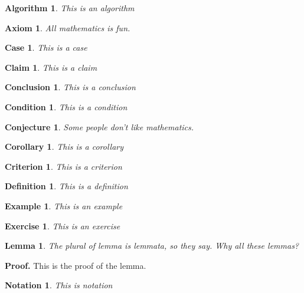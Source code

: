 \documentclass{article}
\newtheorem{algorithm}[theorem]{Algorithm}
\newtheorem{axiom}[theorem]{Axiom}
\newtheorem{case}[theorem]{Case}
\newtheorem{claim}[theorem]{Claim}
\newtheorem{conclusion}[theorem]{Conclusion}
\newtheorem{condition}[theorem]{Condition}
\newtheorem{conjecture}[theorem]{Conjecture}
\newtheorem{corollary}[theorem]{Corollary}
\newtheorem{criterion}[theorem]{Criterion}
\newtheorem{definition}[theorem]{Definition}
\newtheorem{example}[theorem]{Example}
\newtheorem{exercise}[theorem]{Exercise}
\newtheorem{lemma}[theorem]{Lemma}
\newtheorem{notation}[theorem]{Notation}
\newenvironment{proof}[1][]{\textbf{Proof.} }{}
\begin{document}
\begin{algorithm}
This is an algorithm
\end{algorithm}

\begin{axiom}
All mathematics is fun.
\end{axiom}

\begin{case}
This is a case
\end{case}

\begin{claim}
This is a claim
\end{claim}

\begin{conclusion}
This is a conclusion
\end{conclusion}

\begin{condition}
This is a condition
\end{condition}

\begin{conjecture}
Some people don't like mathematics.
\end{conjecture}

\begin{corollary}
This is a corollary
\end{corollary}

\begin{criterion}
This is a criterion
\end{criterion}

\begin{definition}
This is a definition
\end{definition}

\begin{example}
This is an example
\end{example}

\begin{exercise}
This is an exercise
\end{exercise}

\begin{lemma}
The plural of lemma is lemmata, so they say. Why all these lemmas?
\end{lemma}

\begin{proof}
This is the proof of the lemma.
\end{proof}

\begin{notation}
This is notation
\end{notation}
\end{document}
